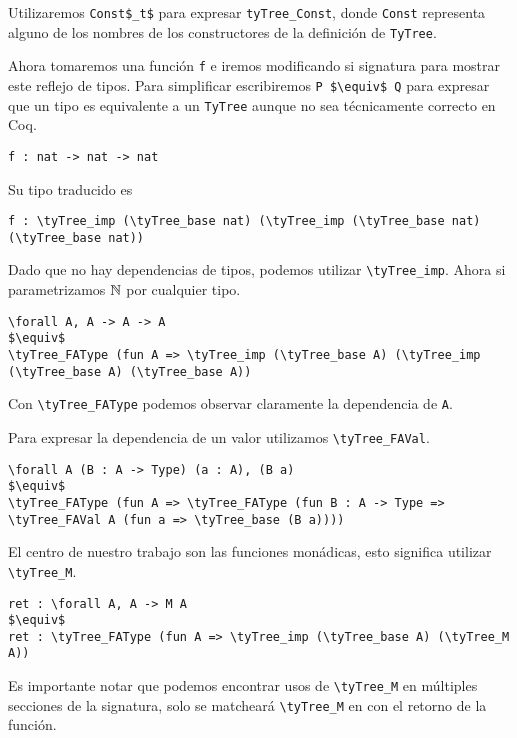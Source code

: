 Utilizaremos \lstinline{Const$_t$} para expresar \lstinline{tyTree_Const}, donde \lstinline{Const} representa alguno de los nombres de los constructores de la definición de \lstinline{TyTree}. 

Ahora tomaremos una función \lstinline{f} e iremos modificando si signatura para mostrar este reflejo de tipos.
Para simplificar escribiremos \lstinline{P $\equiv$ Q} para expresar que un tipo es equivalente a un \lstinline{TyTree} aunque no sea técnicamente correcto en Coq.

\begin{lstlisting}
f : nat -> nat -> nat
\end{lstlisting}

Su tipo traducido es

\begin{lstlisting}
f : \tyTree_imp (\tyTree_base nat) (\tyTree_imp (\tyTree_base nat) (\tyTree_base nat))
\end{lstlisting}

Dado que no hay dependencias de tipos, podemos utilizar \lstinline{\tyTree_imp}. Ahora si parametrizamos
$\mathbb{N}$ por cualquier tipo.

\begin{lstlisting}
\forall A, A -> A -> A
$\equiv$
\tyTree_FAType (fun A => \tyTree_imp (\tyTree_base A) (\tyTree_imp (\tyTree_base A) (\tyTree_base A))
\end{lstlisting}

Con \lstinline{\tyTree_FAType} podemos observar claramente la dependencia de \lstinline{A}.

Para expresar la dependencia de un valor utilizamos \lstinline{\tyTree_FAVal}.

\begin{lstlisting}
\forall A (B : A -> Type) (a : A), (B a)
$\equiv$
\tyTree_FAType (fun A => \tyTree_FAType (fun B : A -> Type => \tyTree_FAVal A (fun a => \tyTree_base (B a))))
\end{lstlisting}

El centro de nuestro trabajo son las funciones monádicas, esto significa utilizar \lstinline{\tyTree_M}.

\begin{lstlisting}
ret : \forall A, A -> M A
$\equiv$
ret : \tyTree_FAType (fun A => \tyTree_imp (\tyTree_base A) (\tyTree_M A))
\end{lstlisting}

Es importante notar que podemos encontrar usos de \lstinline{\tyTree_M} en múltiples secciones de la signatura, solo se matcheará \lstinline{\tyTree_M} en \lift con el retorno de la función. 

